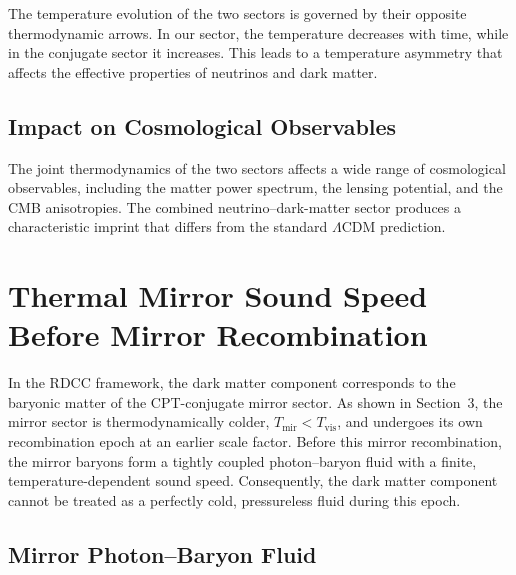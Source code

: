 \documentclass[11pt,a4paper]{article}
\begin{document}
The temperature evolution of the two sectors is governed by their opposite
thermodynamic arrows. In our sector, the temperature decreases with time,
while in the conjugate sector it increases. This leads to a temperature
asymmetry that affects the effective properties of neutrinos and dark matter.




\subsection{Impact on Cosmological Observables}

The joint thermodynamics of the two sectors affects a wide range of
cosmological observables, including the matter power spectrum, the lensing
potential, and the CMB anisotropies. The combined neutrino–dark-matter sector
produces a characteristic imprint that differs from the standard $\Lambda$CDM
prediction.


\section{Thermal Mirror Sound Speed Before Mirror Recombination}

In the RDCC framework, the dark matter component corresponds to the baryonic
matter of the CPT-conjugate mirror sector. As shown in Section~3, the mirror
sector is thermodynamically colder, $T_{\mathrm{mir}} < T_{\mathrm{vis}}$, and
undergoes its own recombination epoch at an earlier scale factor. Before this
mirror recombination, the mirror baryons form a tightly coupled photon–baryon
fluid with a finite, temperature-dependent sound speed. Consequently, the dark
matter component cannot be treated as a perfectly cold, pressureless fluid
during this epoch.




\subsection{Mirror Photon–Baryon Fluid}
\end{document}

